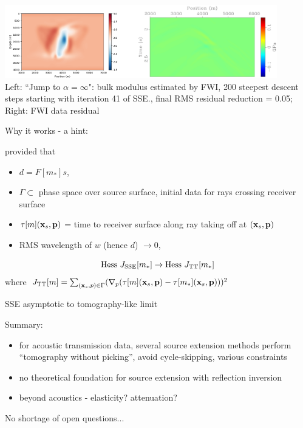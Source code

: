 \documentclass[xcolor=dvipsnames,12pt,aspectratio=169]{beamer}
\begin{document}
\begin{frame}
\begin{center}
\includegraphics[height=1.25in]{Fig/covmestfwicgw41.png}\includegraphics[height=1.25in]{Fig/residcovmestfwicgw41wind.pdf}\\
\vspace{0.25in}
Left: ``Jump to $\alpha=\infty$": bulk modulus estimated by FWI, 200
steepest descent steps starting with iteration 41 of SSE., final RMS residual reduction = 0.05;
Right: FWI data residual 
\end{center}
\end{frame}

\begin{frame}
  Why it works - a hint:

provided that
\begin{itemize}
\item $d = F[m_*]s$,
\item $\Gamma \subset$ phase space over source surface, initial data
  for rays crossing receiver surface
\item $\tau[m](\mathbf{x}_s,\mathbf{p})$ = time to receiver surface along ray taking
  off at $(\mathbf{x}_s,\mathbf{p})$
\item RMS wavelength of $w$ (hence $d$) $\rightarrow 0$,
\end{itemize}
\[
  \mbox{Hess }  J_{\rm SSE}[m_*] \rightarrow \mbox{Hess } J_{\rm TT}[m_*]
\]
where $J_{\rm TT}[m] = \sum_{(\mathbf{x}_s,p) \in \Gamma} (\nabla_p(\tau[m](\mathbf{x}_s,\mathbf{p}) -
\tau[m_*](\mathbf{x}_s,\mathbf{p})))^2$

{\color{blue} SSE asymptotic to tomography-like limit}

\end{frame}

\begin{frame}
Summary:

\begin{itemize}
\item for acoustic transmission data, several source extension methods
  perform ``tomography without picking'', avoid cycle-skipping,
  various constraints
\item no theoretical foundation for source extension with
  reflection inversion
\item beyond acoustics - elasticity? attenuation?
\end{itemize}

No shortage of open questions...
\end{frame}
\end{document}

